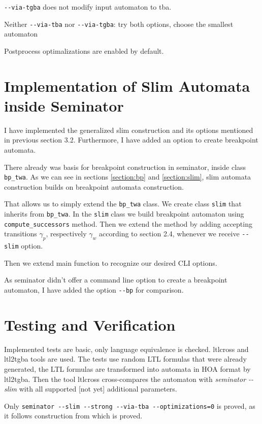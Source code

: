 \documentclass[
	digital
nolof, nolot
]{fithesis3}
\begin{document}
		\texttt{-{}-via-tgba} does not modify input automaton to tba.
		
		Neither \texttt{-{}-via-tba} nor \texttt{-{}-via-tgba}: try both options, choose the smallest automaton
		
		Postprocess optimalizations are enabled by default.
		
		
	\section{Implementation of Slim Automata inside Seminator}
	I have implemented the generalized slim construction and its options mentioned in previous section 3.2. Furthermore, I have added an option to create breakpoint automata.
	
	There already was basis for breakpoint construction in seminator, inside class \texttt{bp\_twa}.
	As we can see in sections \ref{section:bp} and \ref{section:slim}, slim automata construction builds on breakpoint automata construction.
	
	That allows us to simply extend the \texttt{bp\_twa} class.
	We create class \texttt{slim} that inherits from \texttt{bp\_twa}.
	In the \texttt{slim} class we build breakpoint automaton using \texttt{compute\_successors} method.
	Then we extend the method by adding accepting transitions $\gamma_p$, respectively $\gamma_w$ according to section 2.4, whenever we receive \texttt{-{}-slim} option.
	
	Then we extend main function to recognize our desired CLI options.
	
	As seminator didn't offer a command line option to create a breakpoint automaton, I have added the option \texttt{-{}-bp} for comparison.
	
	
	
	\section{Testing and Verification}
	Implemented tests are basic, only language equivalence is checked.
	ltlcross and ltl2tgba tools are used. The tests use random LTL formulas that were already generated, the LTL formulas are transformed into automata in HOA format by ltl2tgba.
	Then the tool ltlcross cross-compares the automaton with \emph{seminator -{}-slim} with all supported [not yet] additional parameters.
	
	Only \texttt{seminator -{}-slim -{}-strong -{}-via-tba -{}-optimizations=0} is proved, as it follows construction from \cite{hlavni} which is proved.
	
\end{document}

